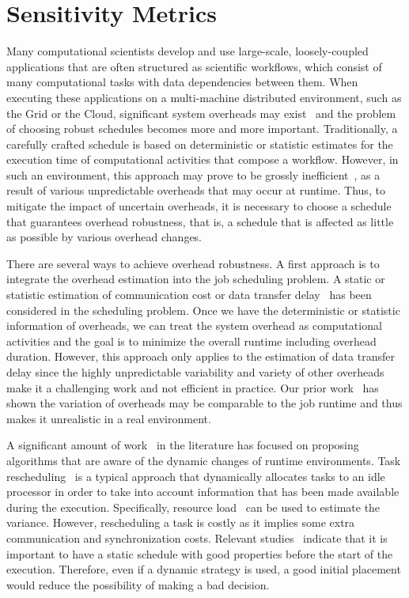 
\section{Sensitivity Metrics}
\label{sec:sensitivity}


Many computational scientists develop and use large-scale, loosely-coupled applications that are often structured as scientific workflows, which consist of many computational tasks with data dependencies between them. When executing these applications on a multi-machine distributed environment, such as the Grid or the Cloud, significant system overheads may exist~\cite{Chen2011, Prodan2008, Dong2010, Yang03, Chen2012a} and the problem of choosing robust schedules becomes more and more important. Traditionally, a carefully crafted schedule is based on deterministic or statistic estimates for the execution time of computational activities that compose a workflow. However, in such an environment, this approach may prove to be grossly inefficient~\cite{Chen2012a}, as a result of various unpredictable overheads that may occur at runtime. 
Thus, to mitigate the impact of uncertain overheads, it is necessary to choose a schedule that guarantees overhead robustness, that is, a schedule that is affected as little as possible by various overhead changes.  

There are several ways to achieve overhead robustness. A first approach is to integrate the overhead estimation into the job scheduling problem. A static or statistic estimation of communication cost or data transfer delay~\cite{Dong2010, Yang03} has been considered in the scheduling problem. Once we have the deterministic or statistic information of overheads, we can treat the system overhead as computational activities and the goal is to minimize the overall runtime including overhead duration. However, this approach only applies to the estimation of data transfer delay since the highly unpredictable variability and variety of other overheads make it a challenging work and not efficient in practice. Our prior work~\cite{Chen2011} has shown the variation of overheads may be comparable to the job runtime and thus makes it unrealistic in a real environment.  

A significant amount of work~\cite{Chetto1990, Dong2010, Yang03} in the literature has focused on proposing algorithms that are aware of the dynamic changes of runtime environments. Task rescheduling~\cite{Sakellariou2004, Zhang2009a} is a typical approach that dynamically allocates tasks to an idle processor in order to take into account information that has been made available during the execution. Specifically, resource load~\cite{Dong2010} can be used to estimate the variance. However, rescheduling a task is costly as it implies some extra communication and synchronization costs. Relevant studies~\cite{Sakellariou2004} indicate that it is important to have a static schedule with good properties before the start of the execution. Therefore, even if a dynamic strategy is used, a good initial placement would reduce the possibility of making a bad decision. 

